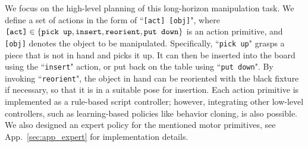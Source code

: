 
We focus on the high-level planning of this long-horizon manipulation task. We define a set of actions in the form of ``{\tt [act] [obj]}", where $\text{\tt [act]}\in \{\text{\tt pick up}, \text{\tt insert}, \text{\tt reorient}, \text{\tt put down}\}$ is an action primitive, and {\tt [obj]} denotes the object to be manipulated. Specifically, ``{\tt pick up}" grasps a piece that is not in hand and picks it up. It can then be inserted into the board using the ``{\tt insert}" action, or put back on the table using ``{\tt put down}". By invoking ``{\tt reorient}", the object in hand can be reoriented with the black fixture if necessary, so that it is in a suitable pose for insertion. Each action primitive is implemented as a rule-based script controller; however, integrating other low-level controllers, such as learning-based policies like behavior cloning, is also possible. We also designed an expert policy for the mentioned motor primitives, see App.~\ref{sec:app_expert} for implementation details.

